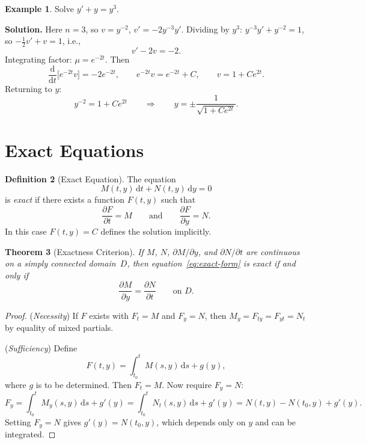 \documentclass[12pt,a4paper,openany]{book}
\theoremstyle{definition}
\newtheorem{definition}{Definition}[chapter]
\newtheorem{example}[definition]{Example}
\theoremstyle{plain}
\newtheorem{theorem}[definition]{Theorem}
\theoremstyle{remark}
\newcommand{\dd}{\mathrm{d}}
\begin{document}
\begin{example}
\label{ex:bernoulli-1}
Solve $y' + y = y^3$.

\textbf{Solution.} Here $n=3$, so $v = y^{-2}$, $v' = -2y^{-3}y'$. Dividing by $y^3$: $y^{-3}y' + y^{-2} = 1$, so $-\frac{1}{2}v' + v = 1$, i.e.,
\[
  v' - 2v = -2.
\]
Integrating factor: $\mu = e^{-2t}$. Then
\[
  \frac{\dd}{\dd t}\!\bigl[e^{-2t}v\bigr] = -2e^{-2t},
  \qquad
  e^{-2t}v = e^{-2t} + C,
  \qquad
  v = 1 + Ce^{2t}.
\]
Returning to $y$:
\[
  y^{-2} = 1 + Ce^{2t}
  \qquad\Longrightarrow\qquad
  y = \pm\frac{1}{\sqrt{1+Ce^{2t}}}.
\]
\end{example}

\section{Exact Equations}
\label{sec:exact}

\begin{definition}[Exact Equation]
\label{def:exact}
The equation
\begin{equation}\label{eq:exact-form}
  M(t,y)\,\dd t + N(t,y)\,\dd y = 0
\end{equation}
is \emph{exact} if there exists a function $F(t,y)$ such that
\[
  \frac{\partial F}{\partial t} = M
  \qquad\text{and}\qquad
  \frac{\partial F}{\partial y} = N.
\]
In this case $F(t,y)=C$ defines the solution implicitly.
\end{definition}

\begin{theorem}[Exactness Criterion]
\label{thm:exactness}
If $M$, $N$, $\partial M/\partial y$, and $\partial N/\partial t$ are continuous on a simply connected domain~$D$, then equation~\eqref{eq:exact-form} is exact if and only if
\begin{equation}\label{eq:exactness-condition}
  \frac{\partial M}{\partial y} = \frac{\partial N}{\partial t}
  \qquad\text{on } D.
\end{equation}
\end{theorem}

\begin{proof}
(\emph{Necessity}) If $F$ exists with $F_t = M$ and $F_y = N$, then $M_y = F_{ty} = F_{yt} = N_t$ by equality of mixed partials.

(\emph{Sufficiency}) Define
\[
  F(t,y) = \int_{t_0}^{t} M(s,y)\,\dd s + g(y),
\]
where $g$ is to be determined. Then $F_t = M$. Now require $F_y = N$:
\[
  F_y = \int_{t_0}^{t} M_y(s,y)\,\dd s + g'(y) = \int_{t_0}^{t} N_t(s,y)\,\dd s + g'(y) = N(t,y) - N(t_0,y) + g'(y).
\]
Setting $F_y = N$ gives $g'(y) = N(t_0,y)$, which depends only on $y$ and can be integrated.
\end{proof}
\end{document}
